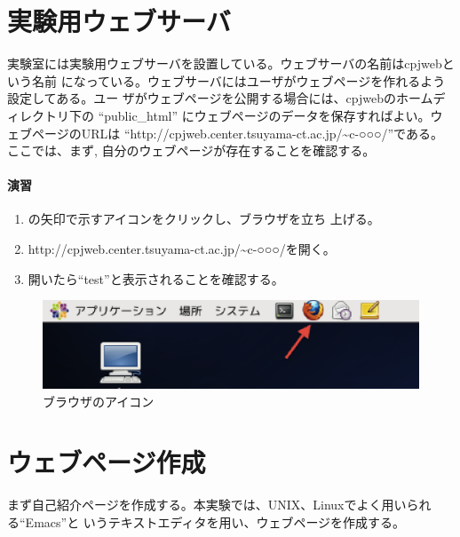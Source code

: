 \section{実験用ウェブサーバ}
実験室には実験用ウェブサーバを設置している。ウェブサーバの名前はcpjwebという名前
になっている。ウェブサーバにはユーザがウェブページを作れるよう設定してある。ユー
ザがウェブページを公開する場合には、cpjwebのホームディレクトリ下の
``public\_html'' にウェブページのデータを保存すればよい。ウェブページのURLは
``http://cpjweb.center.tsuyama-ct.ac.jp/\~{}c-○○○/''である。ここでは、まず,
自分のウェブページが存在することを確認する。

\paragraph{演習}
\begin{enumerate}
\item {}の矢印で示すアイコンをクリックし、ブラウザを立ち
      上げる。
\item http://cpjweb.center.tsuyama-ct.ac.jp/\~{}c-○○○/を開く。
\item 開いたら``test''と表示されることを確認する。
\end{enumerate}

\begin{figure}[htbp]
\begin{center}
\includegraphics[width=0.5\linewidth]{browser-icon.eps}
\caption{ブラウザのアイコン}
\label{fig:browser-icon}
\end{center}
\end{figure}

\section{ウェブページ作成}

まず自己紹介ページを作成する。本実験では、UNIX、Linuxでよく用いられる``Emacs''と
いうテキストエディタを用い、ウェブページを作成する。

